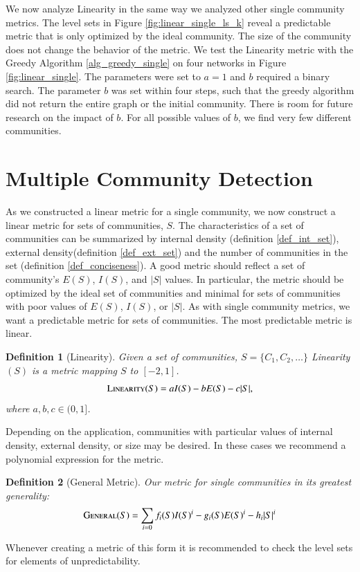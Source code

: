 \documentclass[phd,tocprelim]{cornell}
\newtheorem{definition}{Definition}
\begin{document}
We now analyze {\sc Linearity} in the same way we analyzed other single community metrics.  The level sets in Figure \ref{fig:linear_single_ls_k} reveal a predictable metric that is only optimized by the ideal community. The size of the community does not change the behavior of the metric.  We test the {\sc Linearity} metric  with the Greedy Algorithm \ref{alg_greedy_single} on four networks in Figure \ref{fig:linear_single}.  The parameters were set to $a = 1$ and $b$ required a binary search.  The parameter $b$ was set within four steps, such that the greedy algorithm did not return the entire graph or the initial community. There is room for future research on the impact of $b$.  For all possible values of $b$, we find very few different communities.





\section{Multiple Community Detection}

As we constructed a linear metric for a single community, we now construct a linear metric for sets of communities, $S$.  The characteristics of a set of communities can be summarized by internal density (definition \ref{def_int_set}), external density(definition \ref{def_ext_set}) and the number of communities in the set (definition \ref{def_conciseness}).  A good metric should reflect a set of community's $E(S)$, $I(S)$, and $|S|$ values.  In particular, the metric should be optimized by the ideal set of communities and minimal for sets of communities with poor values of $E(S)$, $I(S)$, or $|S|$.  As with single community metrics, we want a predictable metric for sets of communities.  The most predictable metric is linear.
\begin{definition}[Linearity] Given a set of communities, $S = \{C_1, C_2, \dots \}$ {\sc Linearity}$(S)$ is a metric mapping $S$ to $[-2, 1]$.
  \begin{equation}
   \mbox{\sc Linearity}(S) = a I(S) - b E(S) - c |S|,
  \end{equation}
where $a,b,c \in (0, 1]$.
\end{definition}
Depending on the application, communities with particular values of internal density, external density, or size may be desired.  In these cases we recommend a polynomial expression for the metric.
\begin{definition}[General Metric]
 Our metric for single communities in its greatest generality:
  \begin{equation}
   \mbox{\sc General} (S) = \sum\limits_{i = 0} f_i(S) I(S)^i - g_i(S) E(S)^i - h_i |S|^i
  \end{equation}
\end{definition}
Whenever creating a metric of this form it is recommended to check the level sets for elements of unpredictability.
\end{document}
